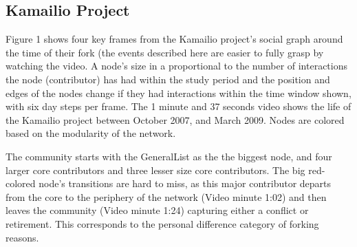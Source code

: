 \documentclass[ifip]{svmult}
\begin{document}
\subsection{Kamailio Project}
Figure 1 shows four key frames from the Kamailio project's social graph around the time of their fork (the events described here are easier to fully grasp by watching the video. A node's size in a proportional to the number of interactions the node (contributor) has had within the study period and the position and edges of the nodes change if they had interactions within the time window shown, with six day steps per frame. The 1 minute and 37 seconds video shows the life of the Kamailio project between October 2007, and March 2009. Nodes are colored based on the modularity of the network. 

The community starts with the GeneralList as the the biggest node, and four larger core contributors and three lesser size core contributors. The big red-colored node's transitions are hard to miss, as this major contributor departs from the core to the periphery of the network (Video minute 1:02) and then leaves the community (Video minute 1:24) capturing either a conflict or retirement. This corresponds to the personal difference category of forking reasons.
\end{document}
